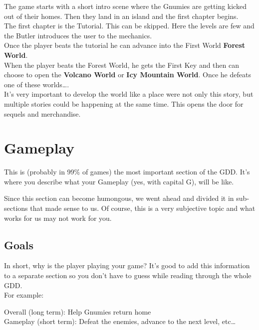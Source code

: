 \documentclass[12pt, a4paper]{article}
\begin{document}
\begin{tcolorbox}
The game starts with a short intro scene where the Gnumies
are getting kicked out of their homes. Then they land in an
island and the first chapter begins.\\

The first chapter is the Tutorial. This can be skipped. Here
the levels are few and the Butler introduces the user to 
the mechanics.\\

Once the player beats the tutorial he can advance into the 
First World \textbf{Forest World}.\\

When the player beats the Forest World, he gets the First Key 
and then can choose to open the \textbf{Volcano World} or \textbf{Icy Mountain World}. Once he defeats one of these worlds….\\

It’s very important to develop the world like a place were 
not only this story, but multiple stories could be happening 
at the same time. This opens the door for sequels and 
merchandise.
\end{tcolorbox}

\section{Gameplay}
This is (probably in 99\% of games) the most important section of the GDD. It’s where you describe what your Gameplay (yes, with capital G), will be like.

Since this section can become humongous, we went ahead and divided it in sub-sections that made sense to us. Of course, this is a very subjective topic and what works for us may not work for you.

\subsection{Goals}
In short, why is the player playing your game? It’s good to add this information to a separate section so you don’t have to guess while reading through the whole GDD.\\

For example:
\begin{tcolorbox}
Overall (long term): Help Gnumies return home\\

Gameplay (short term): Defeat the enemies, advance to the next level, etc…
\end{tcolorbox}
\end{document}
